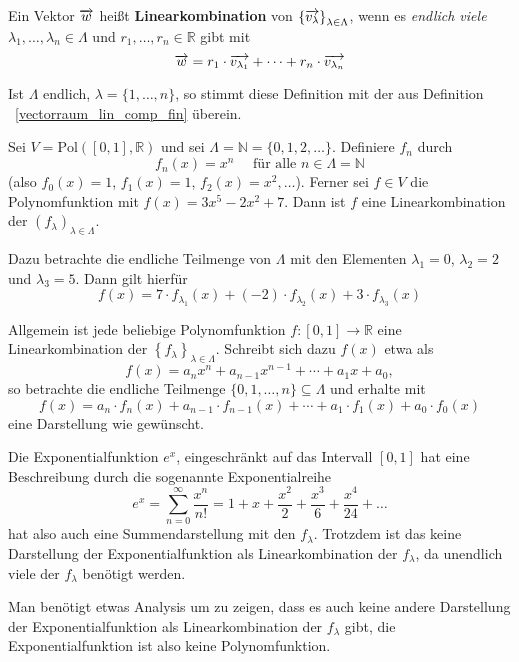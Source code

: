 \begin{definition}\label{vectorraum_lin_comp_infin} Ein Vektor $\overrightarrow{w}$ 
heißt \textbf{Linearkombination} von $\left\{ 
\overrightarrow{v_{\lambda}} \right\}_{\lambda \in \Lambda}$, wenn es \textit{endlich 
viele} $\lambda_1, \ldots , \lambda_n \in \Lambda$  und $r_1, \ldots, r_n \in 
\mathbb R$ gibt mit 
  	$$ \overrightarrow{w} = r_1 \cdot \overrightarrow{v_{\lambda_1}} + \cdots +  r_n \cdot \overrightarrow{v_{\lambda_n}} $$
\end{definition}

\begin{notiz} Ist $\Lambda$ endlich, $\lambda = \{ 1, \ldots, n \}$, so stimmt diese 
Definition mit der aus Definition ~\ref{vectorraum_lin_comp_fin} überein.
\end{notiz}

\begin{beispiel}\label{vectorraum_poly_infin} Sei $V = \textrm{Pol}([0,1], \mathbb R)$ und sei 
$\Lambda = \mathbb N = \{0, 1, 2, \ldots \}$. Definiere $f_n$ durch 
  	$$ f_n(x) = x^n \quad \textrm{ für alle } n \in \Lambda = \mathbb N $$
(also $f_0(x) = 1$, $f_1(x) = 1$, $f_2(x) = x^2, \ldots$). Ferner sei $f \in V$ die 
Polynomfunktion mit $f(x) = 3x^5 -2 x^2 + 7$. Dann ist $f$ eine Linearkombination der 
$\left( f_{\lambda} \right)_{\lambda \in \Lambda}$. 

Dazu betrachte die endliche Teilmenge von $\Lambda$ mit den Elementen $\lambda_1 = 0$, $\lambda_2 = 2$ und 
$\lambda_3 = 5$. Dann gilt hierfür
 	$$ f(x) = 7 \cdot f_{\lambda_1}(x) + (-2) \cdot f_{\lambda_2}(x) + 3 \cdot 
    	f_{\lambda_3}(x) $$

Allgemein ist jede beliebige Polynomfunktion $f: [0, 1] \longrightarrow \mathbb R$ eine 
Linearkombination der $\left\{ f_{\lambda} \right\}_{\lambda \in \Lambda}$. Schreibt sich dazu $f(x)$ etwa als
  	$$ f(x) = a_n x^n + a_{n-1} x^{n-1} + \cdots + a_1 x + a_0, $$
so betrachte die endliche Teilmenge $\{0, 1, \ldots, n \} \subseteq \Lambda$ und erhalte mit
  	$$ f(x) = a_n \cdot f_n(x) + a_{n-1} \cdot f_{n-1}(x)  + \cdots + a_1 \cdot f_1(x) + a_0 \cdot f_0(x) $$ 
eine Darstellung wie gewünscht.

Die Exponentialfunktion $e^x$, eingeschränkt auf das Intervall $[0,1]$ hat eine 
Beschreibung durch die sogenannte Exponentialreihe
  	$$ e^x = \sum_{n = 0}^{\infty} \frac {x^n}{n!} = 1 + x + \frac {x^2}{2} + 
	\frac {x^3}{6} + \frac {x^4}{24} + \ldots $$
hat also auch eine Summendarstellung mit den $f_{\lambda}$. Trotzdem ist das keine 
Darstellung der Exponentialfunktion als Linearkombination der $f_{\lambda}$, da 
unendlich viele der $f_{\lambda}$ benötigt werden. 

Man benötigt etwas Analysis um zu zeigen, dass es auch keine andere Darstellung der 
Exponentialfunktion als Linearkombination der $f_{\lambda}$ gibt, die 
Exponentialfunktion ist also keine Polynomfunktion.
\end{beispiel}

